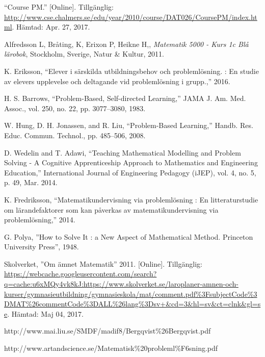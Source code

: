     “Course PM.” [Online]. Tillgänglig: \url{http://www.cse.chalmers.se/edu/year/2010/course/DAT026/CoursePM/index.html}. 
    Hämtad: Apr. 27, 2017.
    
    Alfredsson L, Bråting, K, Erixon P, Heikne H,, \textit{Matematik 5000 - Kurs 1c Blå lärobok}, Stockholm, Sverige, Natur \& Kultur, 2011.
     
    K. Eriksson, “Elever i särskilda utbildningsbehov och problemlösning. : En studie av elevers upplevelse och deltagande vid problemlösning i grupp.,” 2016.
     
     H. S. Barrows, “Problem-Based, Self-directed Learning,” JAMA J. Am. Med. Assoc., vol. 250, no. 22, pp. 3077–3080, 1983.
      
    W. Hung, D. H. Jonassen, and R. Liu, “Problem-Based Learning,” Handb. Res. Educ. Commun. Technol., pp. 485–506, 2008.
    
    D. Wedelin and T. Adawi, “Teaching Mathematical Modelling and Problem Solving - A Cognitive Apprenticeship Approach to Mathematics and Engineering Education,” International Journal of Engineering Pedagogy (iJEP), vol. 4, no. 5, p. 49, Mar. 2014.
    
    K. Fredriksson, “Matematikundervisning via problemlösning : En litteraturstudie om lärandefaktorer som kan påverkas av matematikundervisning via problemlösning,” 2014.
    
    G. Polya, ''How to Solve It : a New Aspect of Mathematical Method. Princeton University Press'', 1948.
    
    Skolverket, ''Om ämnet Matematik'' 2011. [Online]. Tillgänglig: \url{https://webcache.googleusercontent.com/search?q=cache:u6xMQy4vk8kJ:https://www.skolverket.se/laroplaner-amnen-och-kurser/gymnasieutbildning/gymnasieskola/mat/comment.pdf\%3FsubjectCode\%3DMAT\%26commentCode\%3DALL\%26lang\%3Dsv+&cd=3&hl=sv&ct=clnk&gl=se}. Hämtad: Maj 04, 2017.
    
    http://www.mai.liu.se/SMDF/madif8/Bergqvist\%26Bergqvist.pdf
    
    http://www.artandscience.se/Matematisk\%20probleml\%F6sning.pdf
    
